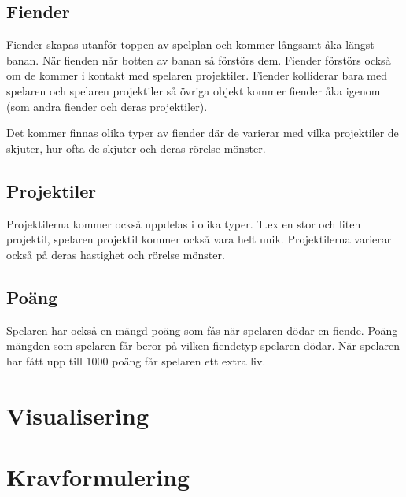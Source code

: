 \documentclass{TDP005mall}
\begin{document}
\subsection{Fiender}
Fiender skapas utanför toppen av spelplan och kommer långsamt åka längst banan. 
När fienden når botten av banan så förstörs dem.
Fiender förstörs också om de kommer i kontakt med spelaren projektiler.
Fiender kolliderar bara med spelaren och spelaren projektiler så övriga objekt kommer fiender åka igenom 
(som andra fiender och deras projektiler).

Det kommer finnas olika typer av fiender där de varierar med vilka projektiler de skjuter,
hur ofta de skjuter och deras rörelse mönster.
\subsection{Projektiler}
Projektilerna kommer också uppdelas i olika typer.
T.ex en stor och liten projektil, spelaren projektil kommer också vara helt unik.
Projektilerna varierar också på deras hastighet och rörelse mönster.

\subsection{Poäng}
Spelaren har också en mängd poäng som fås när spelaren dödar en fiende. 
Poäng mängden som spelaren får beror på vilken fiendetyp spelaren dödar.
När spelaren har fått upp till 1000 poäng får spelaren ett extra liv.

\section{Visualisering}
\section{Kravformulering}
\end{document}
